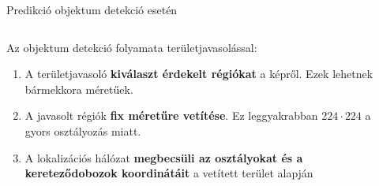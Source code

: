 \documentclass[english, aspectratio=169]{beamer}
\begin{document}
\begin{frame}{Predikció objektum detekció esetén}
\begin{columns}
\begin{column}{.4\textwidth}
Az objektum detekció folyamata területjavasolással:
\begin{enumerate}
	\item A területjavasoló \textbf{kiválaszt érdekelt régiókat} a képről. Ezek lehetnek bármekkora méretűek.
	\item A javasolt régiók \textbf{fix méretűre vetítése}. Ez leggyakrabban $224 \cdot 224$ a gyors osztályozás miatt. 
	\item A lokalizációs hálózat \textbf{megbecsüli az osztályokat és a kereteződobozok koordinátáit} a vetített terület alapján
\end{enumerate}
\end{column}
\begin{column}{.6\textwidth}
\begin{center}
\end{center}
\end{column}
\end{columns}
\end{frame}
\end{document}
